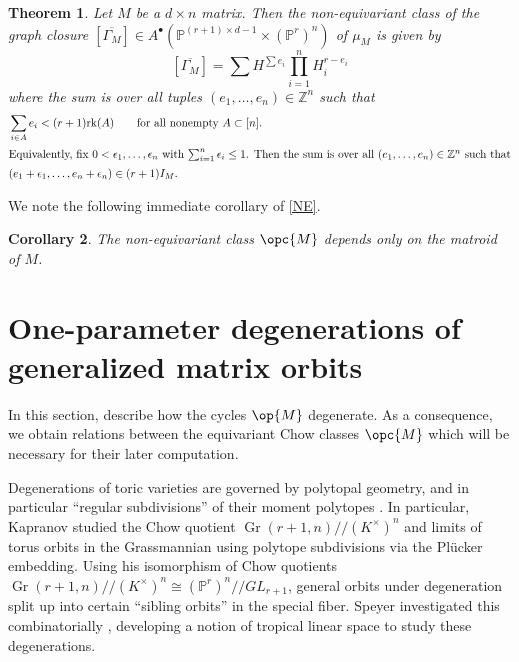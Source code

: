 \documentclass[12pt]{amsart}
\newcommand{\mb}{\mathbb}
\newcommand{\ol}{\overline}
\newcommand{\rk}{{\rm rk}}
\newcommand{\Gr}{{\operatorname{Gr}}}
\theoremstyle{plain}
\newtheorem{Thm}{Theorem}[section]
\newtheorem{Cor}[Thm]{Corollary}
\theoremstyle{definition}
\theoremstyle{remark}
\begin{document}
\begin{Thm}\label{NEgraphclosure}
Let $M$ be a $d \times n$ matrix. Then the non-equivariant class of the graph closure $[\ol{\Gamma_M}]\in A^\bullet(\mb{P}^{(r+1)\times d-1}\times (\mb{P}^r)^n)$ of $\mu_M$ is given by $$[\ol{\Gamma_M}]=\sum H^{\sum e_i} \prod_{i=1}^n H_i^{r-e_i}$$
where the sum is over all tuples $(e_1, \ldots, e_n)\in \mb{Z}^n$ such that
\begin{align*}
&\sum_{i \in A} e_i < (r+1)\rk(A)\qquad\text{for all nonempty $A\subset [n]$.}\\
\intertext{Equivalently, fix $0<\epsilon_1,\ldots,\epsilon_n$ with $\sum_{i=1}^n \epsilon_i\leq 1$. Then the sum is over all $(e_1, \ldots, e_n)\in \mb{Z}^n$ such that}
&(e_1+\epsilon_1, \ldots, e_n + \epsilon_n) \in (r+1)I_M.
\end{align*}
\end{Thm}

We note the following immediate corollary of \cref{NE}.
\begin{Cor}
The non-equivariant class $\opc{M}$ depends only on the matroid of $M$.
\end{Cor}

\section{One-parameter degenerations of generalized matrix orbits}\label{degenerations}
In this section, describe how the cycles $\op{M}$ degenerate. As a consequence, we obtain relations between the equivariant Chow classes $\opc{M}$ which will be necessary for their later computation.


Degenerations of toric varieties are governed by polytopal geometry, and in particular ``regular subdivisions'' of their moment polytopes \cite{GelfandZelevinsky, GrossSeibert}. In particular, Kapranov \cite{Kapranov} studied the Chow quotient $\Gr(r+1,n)//(K^\times)^n$  and limits of torus orbits in the Grassmannian using polytope subdivisions via the Pl\"ucker embedding.  Using his isomorphism of Chow quotients $\Gr(r+1,n)//(K^\times)^n \cong (\mb{P}^r)^n//GL_{r+1}$, general orbits under degeneration split up into certain ``sibling orbits'' in the special fiber. Speyer investigated this combinatorially \cite{SpeThesis, TropicalLinearSpaces}, developing a notion of tropical linear space to study these degenerations.
\end{document}
